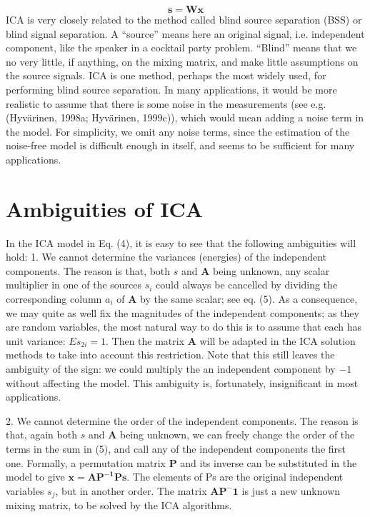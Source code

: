 \documentclass[12pt, a4paper, onecolumn]{IEEEtran}
\begin{document}
\begin{equation}
    \mathbf{s=Wx}
\end{equation}
ICA is very closely related to the method called blind source separation (BSS) or blind signal separation. A “source” means here an original signal, i.e. independent component, like the speaker in a cocktail party problem. “Blind” means that we no very little, if anything, on the mixing matrix, and make little assumptions on the source signals. ICA is one method, perhaps the most widely used, for performing blind source separation.
In many applications, it would be more realistic to assume that there is some noise in the measurements (see e.g. (Hyvärinen, 1998a; Hyvärinen, 1999c)), which would mean adding a noise term in the model. For simplicity, we omit any noise terms, since the estimation of the noise-free model is difficult enough in itself, and seems to be sufficient for many applications.

\section{Ambiguities of ICA}
In the ICA model in Eq. (4), it is easy to see that the following ambiguities will hold: 1. We cannot determine the variances (energies) of the independent components.
The reason is that, both $s$ and $\mathbf{A}$ being unknown, any scalar multiplier in one of the sources $s_i$ could always be cancelled by dividing the corresponding column $a_i$ of $\mathbf{A}$ by the same scalar; see eq. (5). As a consequence, we may quite as well fix the magnitudes of the independent components; as they are random variables, the most natural way to do this is to assume that each has unit variance: $E{s_{2i}} = 1$. Then the matrix $\mathbf{A}$ will be adapted in the ICA solution methods to take into account this restriction. Note that this still leaves the ambiguity of the sign: we could multiply the an independent component by $−1$ without affecting the model. This ambiguity is, fortunately, insignificant in most applications.

2. We cannot determine the order of the independent components.
The reason is that, again both $s$ and $\mathbf{A}$ being unknown, we can freely change the order of the terms in the sum in (5), and call any of the independent components the first one. Formally, a permutation matrix $\mathbf{P}$ and its inverse can be substituted in the model to give $\mathbf{x = AP^{−1}Ps}$. The elements of Ps are the original independent variables $s_j$, but in another order. The matrix $\mathbf{AP^−1}$ is just a new unknown mixing matrix, to be solved by the ICA algorithms.
\end{document}
